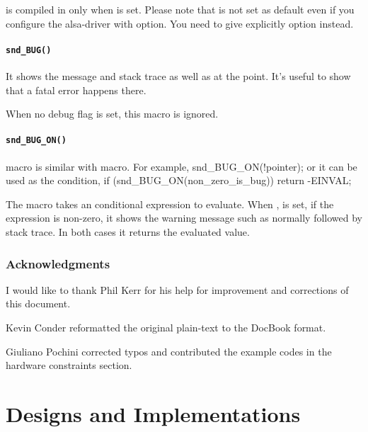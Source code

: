 \documentclass[a4paper,8pt,english]{sphinxmanual}
\begin{document}
 is compiled in only when
 is set. Please note that
 is not set as default even if you configure
the alsa-driver with  option. You need to give
explicitly  option instead.


\subsubsection{\texttt{snd\_BUG()}}
\label{sound/kernel-api/writing-an-alsa-driver:snd-bug}
It shows the  message and stack trace as well as
 at the point. It's useful to show that a
fatal error happens there.

When no debug flag is set, this macro is ignored.


\subsubsection{\texttt{snd\_BUG\_ON()}}
\label{sound/kernel-api/writing-an-alsa-driver:snd-bug-on}
 macro is similar with
 macro. For example, snd\_BUG\_ON(!pointer); or
it can be used as the condition, if (snd\_BUG\_ON(non\_zero\_is\_bug))
return -EINVAL;

The macro takes an conditional expression to evaluate. When
, is set, if the expression is non-zero, it shows
the warning message such as  normally followed by stack
trace. In both cases it returns the evaluated value.


\subsection{Acknowledgments}
\label{sound/kernel-api/writing-an-alsa-driver:acknowledgments}
I would like to thank Phil Kerr for his help for improvement and
corrections of this document.

Kevin Conder reformatted the original plain-text to the DocBook format.

Giuliano Pochini corrected typos and contributed the example codes in
the hardware constraints section.


\chapter{Designs and Implementations}
\label{sound/designs/index:designs-and-implementations}\label{sound/designs/index::doc}
\end{document}
